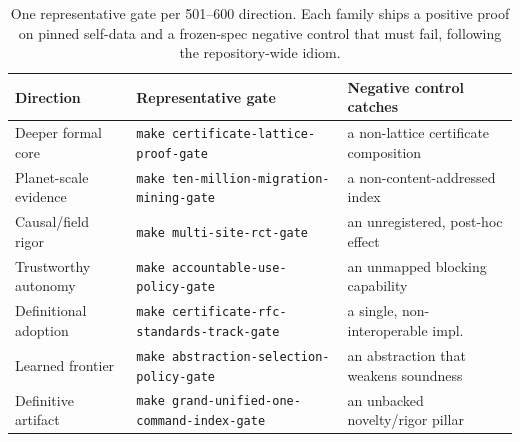 \documentclass[11pt]{article}
\newcommand{\gate}[1]{\texttt{make #1}}
\begin{document}
\begin{table}[t]
\centering
\small
\begin{tabular}{@{}lll@{}}
\toprule
\textbf{Direction} & \textbf{Representative gate} & \textbf{Negative control catches} \\
\midrule
Deeper formal core & \gate{certificate-lattice-proof-gate} & a non-lattice certificate composition \\
Planet-scale evidence & \gate{ten-million-migration-mining-gate} & a non-content-addressed index \\
Causal/field rigor & \gate{multi-site-rct-gate} & an unregistered, post-hoc effect \\
Trustworthy autonomy & \gate{accountable-use-policy-gate} & an unmapped blocking capability \\
Definitional adoption & \gate{certificate-rfc-standards-track-gate} & a single, non-interoperable impl. \\
Learned frontier & \gate{abstraction-selection-policy-gate} & an abstraction that weakens soundness \\
Definitive artifact & \gate{grand-unified-one-command-index-gate} & an unbacked novelty/rigor pillar \\
\bottomrule
\end{tabular}
\caption{One representative gate per 501--600 direction. Each family ships a positive proof on pinned
self-data and a frozen-spec negative control that must fail, following the repository-wide idiom.}
\label{tab:frontier3}
\end{table}
\end{document}
